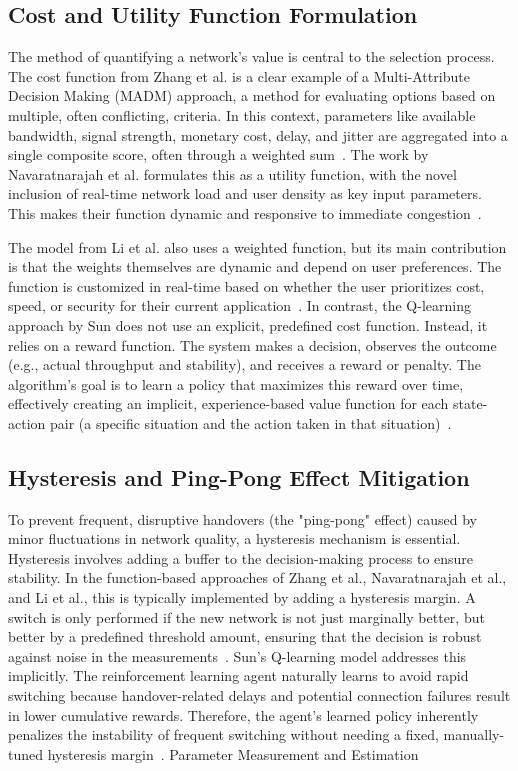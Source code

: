 \subsection{Cost and Utility Function Formulation}

The method of quantifying a network's value is central to the selection process. The cost function from Zhang et al. is a clear example of a Multi-Attribute Decision Making (MADM) approach, a method for evaluating options based on multiple, often conflicting, criteria. In this context, parameters like available bandwidth, signal strength, monetary cost, delay, and jitter are aggregated into a single composite score, often through a weighted sum~\cite{zhang2015}. The work by Navaratnarajah et al. formulates this as a utility function, with the novel inclusion of real-time network load and user density as key input parameters. This makes their function dynamic and responsive to immediate congestion~\cite{navaratnarajah2017}.

The model from Li et al. also uses a weighted function, but its main contribution is that the weights themselves are dynamic and depend on user preferences. The function is customized in real-time based on whether the user prioritizes cost, speed, or security for their current application~\cite{li2018}. In contrast, the Q-learning approach by Sun does not use an explicit, predefined cost function. Instead, it relies on a reward function. The system makes a decision, observes the outcome (e.g., actual throughput and stability), and receives a reward or penalty. The algorithm's goal is to learn a policy that maximizes this reward over time, effectively creating an implicit, experience-based value function for each state-action pair (a specific situation and the action taken in that situation)~\cite{sun2019}.

\subsection{Hysteresis and Ping-Pong Effect Mitigation}

To prevent frequent, disruptive handovers (the "ping-pong" effect) caused by minor fluctuations in network quality, a hysteresis mechanism is essential. Hysteresis involves adding a buffer to the decision-making process to ensure stability. In the function-based approaches of Zhang et al., Navaratnarajah et al., and Li et al., this is typically implemented by adding a hysteresis margin. A switch is only performed if the new network is not just marginally better, but better by a predefined threshold amount, ensuring that the decision is robust against noise in the measurements~\cite{zhang2015, navaratnarajah2017, li2018}. Sun's Q-learning model addresses this implicitly. The reinforcement learning agent naturally learns to avoid rapid switching because handover-related delays and potential connection failures result in lower cumulative rewards. Therefore, the agent's learned policy inherently penalizes the instability of frequent switching without needing a fixed, manually-tuned hysteresis margin~\cite{sun2019}.
Parameter Measurement and Estimation

